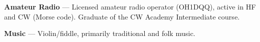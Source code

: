 \textbf{Amateur Radio} --- Licensed amateur radio operator (OH1DQQ),
active in HF and CW (Morse code). Graduate of the CW Academy
Intermediate course.

\vspace{0.5em}
 
\textbf{Music} --- Violin/fiddle, primarily traditional and folk music.
